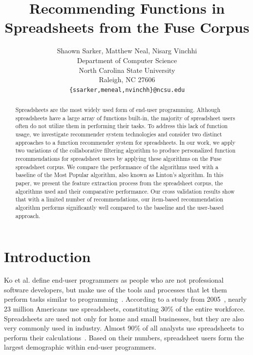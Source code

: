 \documentclass{article} %
\title{Recommending Functions in Spreadsheets from the Fuse Corpus}
\author{
Shaown Sarker, Matthew Neal, Nisarg Vinchhi\\
Department of Computer Science\\
North Carolina State University\\
Raleigh, NC 27606 \\
\texttt{\{ssarker,meneal,nvinchh\}@ncsu.edu}
}
\begin{document}
\maketitle

\begin{abstract}
Spreadsheets are the most widely used form of end-user programming. Although spreadsheets have a large array of functions built-in, the majority of spreadsheet users often do not utilize them in performing their tasks. To address this lack of function usage, we investigate recommender system technologies and consider two distinct approaches to a function recommender system for spreadsheets. In our work, we apply two variations of the collaborative filtering algorithm to produce personalized function recommendations for spreadsheet users by applying these algorithms on the Fuse spreadsheet corpus. We compare the performance of the algorithms used with a baseline of the Most Popular algorithm, also known as Linton's algorithm. In this paper, we present the feature extraction process from the spreadsheet corpus, the algorithms used and their comparative performance. Our cross validation results show that with a limited number of recommendations, our item-based recommendation algorithm performs significantly well compared to the baseline and the user-based approach.
\end{abstract}

\section{Introduction}
Ko et al. define end-user programmers as people who are not professional software developers, but make use of the tools and processes that let them perform tasks similar to programming~\cite{ko2011state}. According to a study from 2005~\cite{scaffidi2005estimating}, nearly 23 million Americans use spreadsheets, constituting 30\% of the entire workforce. Spreadsheets are used not only for home and small businesses, but they are also very commonly used in industry. Almost 90\% of all analysts use spreadsheets to perform their calculations~\cite{winston2001executive}. Based on their numbers, spreadsheet users form the largest demographic within end-user programmers.
\end{document}
